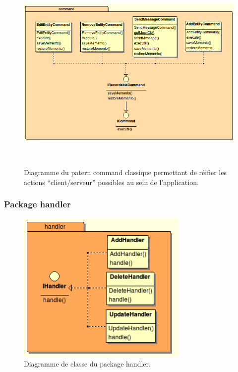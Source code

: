 \documentclass{article}
\begin{document}
\begin{figure}[hbtp]
\begin{center}
\includegraphics[height=280pt]{doc_dev-fig006.png}
\caption{Diagramme du patern command classique permettant de réifier les actions “client/serveur” possibles au sein de l’application.}
\end{center}
\end{figure}

\newpage
\subsubsection{Package handler}
\begin{figure}[htbp]
\begin{center}
\includegraphics[width=233pt, height=209pt]{doc_dev-fig007.png}
\caption{Diagramme de classe du package handler.}
\end{center}
\end{figure}
\end{document}

